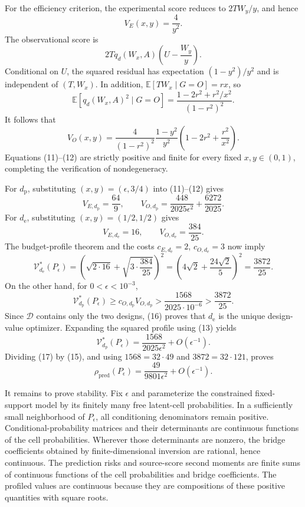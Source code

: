For the efficiency criterion, the experimental score reduces to \(2TW_y/y\), and hence
\[
 V_E(x,y)=\frac4{y^2}. \tag{11}
\]
The observational score is
\[
 2Tq_d(W_x,A)\left(U-\frac{W_y}{y}\right).
\]
Conditional on \(U\), the squared residual has expectation \((1-y^2)/y^2\) and is independent of \((T,W_x)\). In addition, \(\mathbb E[TW_x\mid G=O]=rx\), so
\[
 \mathbb E[q_d(W_x,A)^2\mid G=O]
 =\frac{1-2r^2+r^2/x^2}{(1-r^2)^2}.
\]
It follows that
\[
 V_O(x,y)=
 \frac4{(1-r^2)^2}\frac{1-y^2}{y^2}
 \left(1-2r^2+\frac{r^2}{x^2}\right). \tag{12}
\]
Equations (11)--(12) are strictly positive and finite for every fixed \(x,y\in(0,1)\), completing the verification of nondegeneracy.

For \(d_{\mathrm p}\), substituting \((x,y)=(\epsilon,3/4)\) into (11)--(12) gives
\[
 V_{E,d_{\mathrm p}}=\frac{64}{9},
 \qquad
 V_{O,d_{\mathrm p}}
 =\frac{448}{2025\epsilon^2}+\frac{6272}{2025}. \tag{13}
\]
For \(d_{\mathrm e}\), substituting \((x,y)=(1/2,1/2)\) gives
\[
 V_{E,d_{\mathrm e}}=16,
 \qquad
 V_{O,d_{\mathrm e}}=\frac{384}{25}. \tag{14}
\]
The budget-profile theorem and the costs \(c_{E,d_{\mathrm e}}=2\), \(c_{O,d_{\mathrm e}}=3\) now imply
\[
 \mathcal V_{d_{\mathrm e}}^*(P_\epsilon)
 =\left(\sqrt{2\cdot16}+\sqrt{3\cdot\frac{384}{25}}\right)^2
 =\left(4\sqrt2+\frac{24\sqrt2}{5}\right)^2
 =\frac{3872}{25}. \tag{15}
\]
On the other hand, for \(0<\epsilon<10^{-3}\),
\[
 \mathcal V_{d_{\mathrm p}}^*(P_\epsilon)
 \ge c_{O,d_{\mathrm p}}V_{O,d_{\mathrm p}}
 >\frac{1568}{2025\cdot10^{-6}}
 >\frac{3872}{25}. \tag{16}
\]
Since \(\mathcal D\) contains only the two designs, (16) proves that \(d_{\mathrm e}\) is the unique design-value optimizer. Expanding the squared profile using (13) yields
\[
 \mathcal V_{d_{\mathrm p}}^*(P_\epsilon)
 =\frac{1568}{2025\epsilon^2}+O(\epsilon^{-1}). \tag{17}
\]
Dividing (17) by (15), and using \(1568=32\cdot49\) and \(3872=32\cdot121\), proves
\[
 \rho_{\mathrm{pred}}(P_\epsilon)
 =\frac{49}{9801\epsilon^2}+O(\epsilon^{-1}). \tag{18}
\]

It remains to prove stability. Fix \(\epsilon\) and parameterize the constrained fixed-support model by its finitely many free latent-cell probabilities. In a sufficiently small neighborhood of \(P_\epsilon\), all conditioning denominators remain positive. Conditional-probability matrices and their determinants are continuous functions of the cell probabilities. Wherever those determinants are nonzero, the bridge coefficients obtained by finite-dimensional inversion are rational, hence continuous. The prediction risks and source-score second moments are finite sums of continuous functions of the cell probabilities and bridge coefficients. The profiled values are continuous because they are compositions of these positive quantities with square roots.

